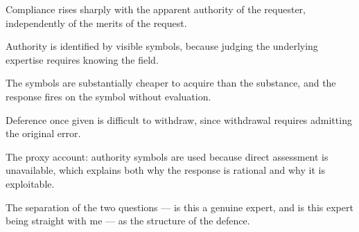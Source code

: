 

\begin{distilled}
  \item Compliance rises sharply with the apparent authority of the requester, independently of the merits of the request.
  \item Authority is identified by visible symbols, because judging the underlying expertise requires knowing the field.
  \item The symbols are substantially cheaper to acquire than the substance, and the response fires on the symbol without evaluation.
  \item Deference once given is difficult to withdraw, since withdrawal requires admitting the original error.
\end{distilled}

\begin{unique}
  \item The proxy account: authority symbols are used because direct assessment is unavailable, which explains both why the response is rational and why it is exploitable.
  \item The separation of the two questions --- is this a genuine expert, and is this expert being straight with me --- as the structure of the defence.
\end{unique}
